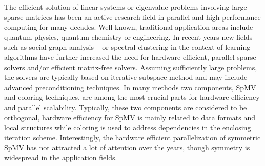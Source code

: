 The efficient solution of linear systems or eigenvalue problems involving large sparse matrices has been an active research field in parallel and high performance computing for many decades. Well-known, traditional application areas include quantum physics, quantum chemistry or engineering. In recent years new fields such as social graph analysis ~\cite{Simpson:2018:BGP:3218176.3218232}
or spectral clustering in the context of learning algorithms \cite{vonLuxburg2007,JMLR:v17:16-109} have further increased the need for hardware-efficient, parallel sparse solvers and/or efficient matrix-free solvers. Assuming sufficiently large problems, the solvers are typically based on iterative subspace method and may include advanced preconditioning techniques. In many methods two components,  \acrfull{SpMV}  and coloring techniques, are among the most crucial parts for hardware efficiency and parallel scalability. Typically, these two components are considered to be orthogonal, \ie hardware efficiency for \Acrshort{SpMV} is mainly related to data formats and local structures while coloring is used to address dependencies in the enclosing iteration scheme.  Interestingly, the hardware efficient parallelization of symmetric \Acrshort{SpMV} has not attracted a lot of attention over the years, though symmetry is widespread in the application fields. 

